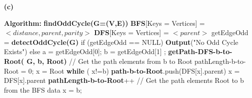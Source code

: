 \documentclass{article}
\renewcommand\part[1]{\vspace{.10in}\textbf{(#1)}}
\newcommand\algo{\vspace{.10in}\textbf{Algorithm: }}
\begin{document}
\part{c}

  \algo \newline
  \textbf {findOddCycle(G=(V,E))} \newline
  \hspace*{0.5cm} \textbf {BFS}[Keys = Vertices] = $<distance, parent, parity>$ \newline
  \hspace*{0.5cm} \textbf {DFS}[Keys = Vertices] = $<parent>$ \newline
  \hspace*{0.5cm} getEdgeOdd = \textbf {detectOddCycle(G)} \newline
  \hspace*{0.5cm} if (getEdgeOdd == NULL) \newline
  \hspace*{1cm}		\textbf {Output}("No Odd Cycle Exists") \newline
  \hspace*{0.5cm} else \newline
  \hspace*{1cm}		a = getEdgeOdd[0]; b = getEdgeOdd[1] ; \newline
  \hspace*{1.0cm}	\textbf {getPath-DFS-b-to-Root( G, b, Root)} \newline
  \hspace*{1.0cm}	// Get the path elements from b to Root \newline
  \hspace*{1.0cm}	pathLength-b-to-Root = 0; x = Root \newline
  \hspace*{1.0cm}	\textbf {while} ( x!=b) \newline
  \hspace*{1.5cm}		\textbf {path-b-to-Root}.push(DFS[x].parent) \newline
  \hspace*{1.5cm}		x = DFS[x].parent \newline
  \hspace*{1.5cm}		\textbf {pathLength-b-to-Root}++ \newline
  \hspace*{1.0cm}	// Get the path elements Root to b from the BFS data \newline
  \hspace*{1.0cm}	x = b; \newline
\end{document}
